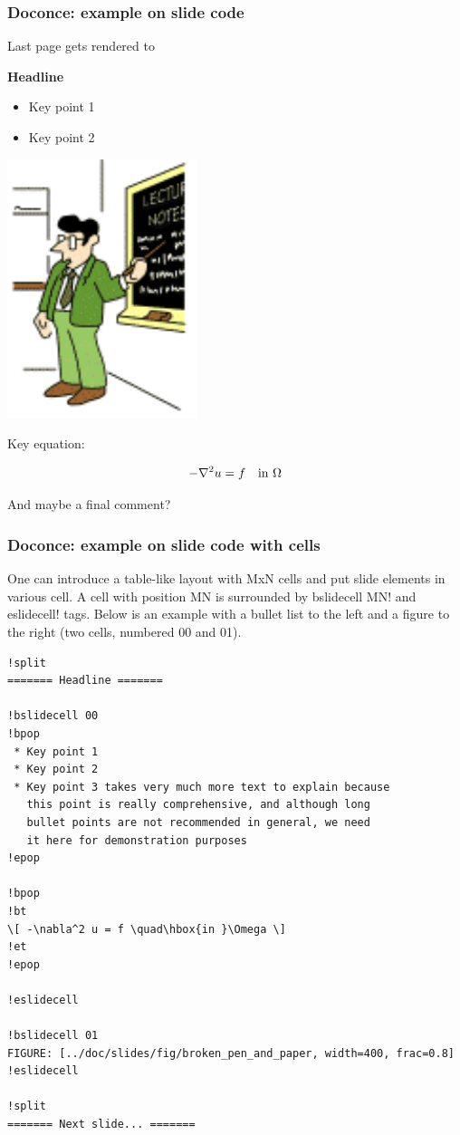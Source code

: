 \documentclass{beamer}
\begin{document}
\begin{frame}
\frametitle{Doconce: example on slide code}

Last page gets rendered to

\noindent\textbf{\Large Headline}

\begin{itemize}
 \item Key point 1

 \item Key point 2
\end{itemize}

\noindent
\begin{center}  %
  \centerline{\includegraphics[width=0.4\linewidth]{../doc/slides/fig/teacher1.pdf}}
\end{center}


Key equation:

\[ -\nabla^2 u = f \quad\hbox{in }\Omega \]

And maybe a final comment?
\end{frame}

\begin{frame}
\frametitle{Doconce: example on slide code with cells}

One can introduce a table-like layout with MxN cells and
put slide elements in various cell. A cell with position
MN is surrounded by \Verb!!bslidecell MN! and \Verb!!eslidecell!
tags. Below is an example with a bullet list to the left and
a figure to the right (two cells, numbered 00 and 01).

\begin{Verbatim}[numbers=none,fontsize=\fontsize{9pt}{9pt},baselinestretch=0.95]
!split
======= Headline =======

!bslidecell 00
!bpop
 * Key point 1
 * Key point 2
 * Key point 3 takes very much more text to explain because
   this point is really comprehensive, and although long
   bullet points are not recommended in general, we need
   it here for demonstration purposes
!epop

!bpop
!bt
\[ -\nabla^2 u = f \quad\hbox{in }\Omega \]
!et
!epop

!eslidecell

!bslidecell 01
FIGURE: [../doc/slides/fig/broken_pen_and_paper, width=400, frac=0.8]
!eslidecell

!split
======= Next slide... =======
\end{Verbatim}
\end{frame}
\end{document}
